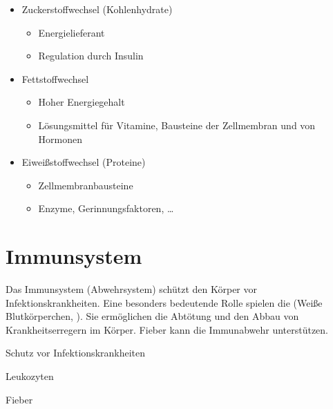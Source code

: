 {}{
\begin{itemize}
  \item Zuckerstoffwechsel (Kohlenhydrate)
  \begin{itemize}
    \item Energielieferant
    \item Regulation durch Insulin
  \end{itemize}
  \item Fettstoffwechsel 
  \begin{itemize}
    \item Hoher Energiegehalt
    \item Lösungsmittel für Vitamine, Bausteine der Zellmembran und von
    Hormonen
  \end{itemize}
  \item Eiweißstoffwechsel (Proteine)
  \begin{itemize}
    \item Zellmembranbausteine
    \item Enzyme, Gerinnungsfaktoren, \ldots
  \end{itemize}
\end{itemize}
}{}{}{}




\cite{AlbertsMolZellbiologie2,LoefflerBiochemie7}


\section{Immunsystem}
\label{topic:immunsystem}

{%
Das Immunsystem (Abwehrsystem) schützt den Körper vor
Infektionskrankheiten. Eine besonders bedeutende Rolle
spielen die  (Weiße Blutkörperchen,
). Sie ermöglichen die Abtötung
und den Abbau von Krankheitserregern im Körper. Fieber kann
die Immunabwehr unterstützen.
}{
\begin{compactitem}
  \item Schutz vor Infektionskrankheiten
  \item Leukozyten
  \item Fieber
\end{compactitem}
}{}{}{}


